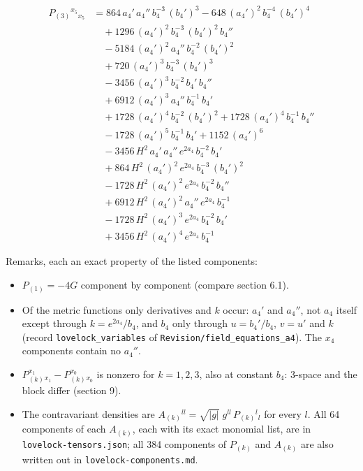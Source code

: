 \documentclass[11pt]{article}
\begin{document}
\[
\begin{aligned}
P_{(3)}{}^{x_5}{}_{x_5} &= 864\,a_4'\,a_4''\,b_4^{-3}\,(b_4')^{3} - 648\,(a_4')^{2}\,b_4^{-4}\,(b_4')^{4} \\
&\quad + 1296\,(a_4')^{2}\,b_4^{-3}\,(b_4')^{2}\,b_4'' \\
&\quad - 5184\,(a_4')^{2}\,a_4''\,b_4^{-2}\,(b_4')^{2} \\
&\quad + 720\,(a_4')^{3}\,b_4^{-3}\,(b_4')^{3} \\
&\quad - 3456\,(a_4')^{3}\,b_4^{-2}\,b_4'\,b_4'' \\
&\quad + 6912\,(a_4')^{3}\,a_4''\,b_4^{-1}\,b_4' \\
&\quad + 1728\,(a_4')^{4}\,b_4^{-2}\,(b_4')^{2} + 1728\,(a_4')^{4}\,b_4^{-1}\,b_4'' \\
&\quad - 1728\,(a_4')^{5}\,b_4^{-1}\,b_4' + 1152\,(a_4')^{6} \\
&\quad - 3456\,H^{2}\,a_4'\,a_4''\,e^{2 a_4}\,b_4^{-2}\,b_4' \\
&\quad + 864\,H^{2}\,(a_4')^{2}\,e^{2 a_4}\,b_4^{-3}\,(b_4')^{2} \\
&\quad - 1728\,H^{2}\,(a_4')^{2}\,e^{2 a_4}\,b_4^{-2}\,b_4'' \\
&\quad + 6912\,H^{2}\,(a_4')^{2}\,a_4''\,e^{2 a_4}\,b_4^{-1} \\
&\quad - 1728\,H^{2}\,(a_4')^{3}\,e^{2 a_4}\,b_4^{-2}\,b_4' \\
&\quad + 3456\,H^{2}\,(a_4')^{4}\,e^{2 a_4}\,b_4^{-1}
\end{aligned}
\]

Remarks, each an exact property of the listed components:

\begin{itemize}
\item $P_{(1)} = -4G$ component by component (compare section 6.1).
\item Of the metric functions only derivatives and $k$ occur: $a_4'$ and $a_4''$, not $a_4$ itself except through $k = e^{2a_4}/b_4$, and $b_4$ only through $u = b_4'/b_4$, $v = u'$ and $k$ (record \texttt{lovelock\allowbreak{}\_variabl\allowbreak{}es} of \texttt{Revision\allowbreak{}/field\_e\allowbreak{}quations\allowbreak{}\_a4}). The $x_4$ components contain no $a_4''$.
\item $P_{(k)}^{x_1}{}_{x_1} - P_{(k)}^{x_0}{}_{x_0}$ is nonzero for $k = 1, 2, 3$, also at constant $b_4$: 3-space and the block differ (section 9).
\item The contravariant densities are $A_{(k)}{}^{ll} = \sqrt{|g|}\;g^{ll}\,P_{(k)}{}^l{}_l$ for every $l$. All 64 components of each $A_{(k)}$, each with its exact monomial list, are in \texttt{lovelock\allowbreak{}-tensors\allowbreak{}.json}; all 384 components of $P_{(k)}$ and $A_{(k)}$ are also written out in \texttt{lovelock\allowbreak{}-compone\allowbreak{}nts.md}.
\end{itemize}
\end{document}
